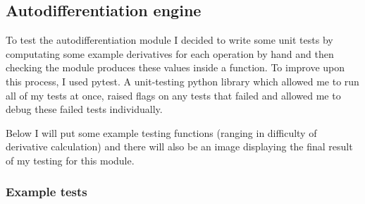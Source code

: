 \documentclass{article}
\begin{document}
    \subsection{Autodifferentiation engine}

    To test the autodifferentiation module I decided to write some unit tests by computating some example
    derivatives for each operation by hand and then checking the module produces these values inside a function.
    To improve upon this process, I used pytest. A unit-testing python library which allowed me to run all of my tests
    at once, raised flags on any tests that failed and allowed me to debug these failed tests individually.

    Below I will put some example testing functions (ranging in difficulty of derivative calculation) and there will
    also be an image displaying the final result of my testing for this module.

    \subsubsection{Example tests}
\end{document}
